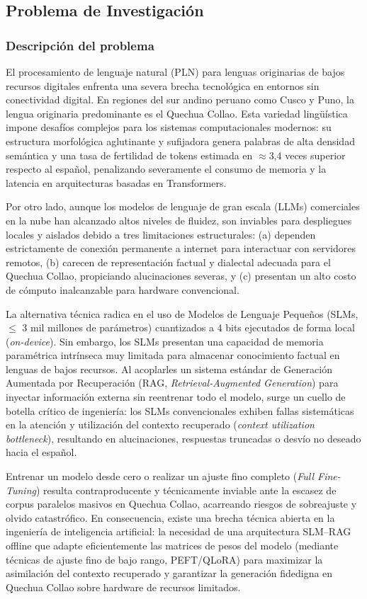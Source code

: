\subsection{Problema de Investigación}

\subsubsection{Descripción del problema}
El procesamiento de lenguaje natural (PLN) para lenguas originarias de bajos recursos digitales enfrenta una severa brecha tecnológica en entornos sin conectividad digital. En regiones del sur andino peruano como Cusco y Puno, la lengua originaria predominante es el Quechua Collao. Esta variedad lingüística impone desafíos complejos para los sistemas computacionales modernos: su estructura morfológica aglutinante y sufijadora genera palabras de alta densidad semántica y una tasa de fertilidad de tokens estimada en $\approx$3,4 veces superior respecto al español, penalizando severamente el consumo de memoria y la latencia en arquitecturas basadas en Transformers.

Por otro lado, aunque los modelos de lenguaje de gran escala (LLMs) comerciales en la nube han alcanzado altos niveles de fluidez, son inviables para despliegues locales y aislados debido a tres limitaciones estructurales: (a) dependen estrictamente de conexión permanente a internet para interactuar con servidores remotos, (b) carecen de representación factual y dialectal adecuada para el Quechua Collao, propiciando alucinaciones severas, y (c) presentan un alto costo de cómputo inalcanzable para hardware convencional.

La alternativa técnica radica en el uso de Modelos de Lenguaje Pequeños (SLMs, $\le$ 3 mil millones de parámetros) cuantizados a 4 bits ejecutados de forma local (\textit{on-device}). Sin embargo, los SLMs presentan una capacidad de memoria paramétrica intrínseca muy limitada para almacenar conocimiento factual en lenguas de bajos recursos. Al acoplarles un sistema estándar de Generación Aumentada por Recuperación (RAG, \textit{Retrieval-Augmented Generation}) para inyectar información externa sin reentrenar todo el modelo, surge un cuello de botella crítico de ingeniería: los SLMs convencionales exhiben fallas sistemáticas en la atención y utilización del contexto recuperado (\textit{context utilization bottleneck}), resultando en alucinaciones, respuestas truncadas o desvío no deseado hacia el español.

Entrenar un modelo desde cero o realizar un ajuste fino completo (\textit{Full Fine-Tuning}) resulta contraproducente y técnicamente inviable ante la escasez de corpus paralelos masivos en Quechua Collao, acarreando riesgos de sobreajuste y olvido catastrófico. En consecuencia, existe una brecha técnica abierta en la ingeniería de inteligencia artificial: la necesidad de una arquitectura SLM--RAG offline que adapte eficientemente las matrices de pesos del modelo (mediante técnicas de ajuste fino de bajo rango, PEFT/QLoRA) para maximizar la asimilación del contexto recuperado y garantizar la generación fidedigna en Quechua Collao sobre hardware de recursos limitados.

